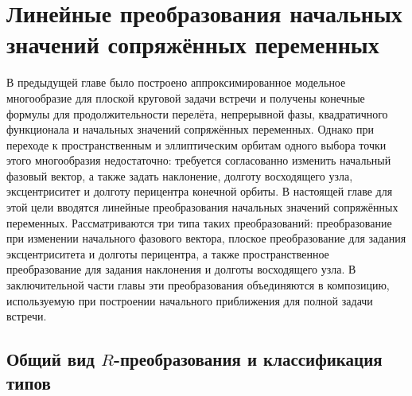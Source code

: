 \chapter{Линейные преобразования начальных значений сопряжённых переменных}

В предыдущей главе было построено аппроксимированное модельное многообразие для плоской круговой задачи встречи и получены конечные формулы для продолжительности перелёта, непрерывной фазы, квадратичного функционала и начальных значений сопряжённых переменных. Однако при переходе к пространственным и эллиптическим орбитам одного выбора точки этого многообразия недостаточно: требуется согласованно изменить начальный фазовый вектор, а также задать наклонение, долготу восходящего узла, эксцентриситет и долготу перицентра конечной орбиты. В настоящей главе для этой цели вводятся линейные преобразования начальных значений сопряжённых переменных. Рассматриваются три типа таких преобразований: преобразование при изменении начального фазового вектора, плоское преобразование для задания эксцентриситета и долготы перицентра, а также пространственное преобразование для задания наклонения и долготы восходящего узла. В заключительной части главы эти преобразования объединяются в композицию, используемую при построении начального приближения для полной задачи встречи.

\section{Общий вид \(R\)-преобразования и классификация типов}

